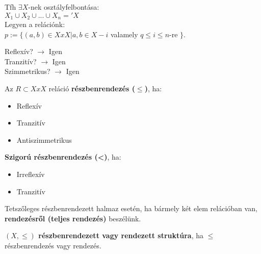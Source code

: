 \begin{frame}
\begin{tcolorbox}[title={Tétel: Ekvivalenciareláció és osztályfelbontás kapcsolata}]
Tfh ${\exists}X$-nek osztályfelbontása:\\

$X_1 \cup X_2 \cup ... \cup X_n =  'X$\\

Legyen a relációnk:\\

$p := \{(a,b) \in X x X | a, b \in X-i$ valamely $q \leq i \leq n$-re $\}$.\\
\mmedskip

Reflexív? $\rightarrow$ Igen\\
Tranzitív? $\rightarrow$ Igen\\
Szimmetrikus? $\rightarrow$ Igen
\end{tcolorbox}
\end{frame}


\begin{frame}
\begin{tcolorbox}[title={Def.: Részbenrendezés, Szigorú részbenrendezés}]
Az $R \subset X x X$ reláció \textbf{részbenrendezés (${\leq}$)}, ha:\\
\begin{itemize}
\item Reflexív
\item Tranzitív
\item Antiszimmetrikus
\end{itemize}
\mmedskip

\textbf{Szigorú részbenrendezés (<)}, ha:\\
\begin{itemize}
\item Irreflexív
\item Tranzitív
\end{itemize}
\end{tcolorbox}

\begin{tcolorbox}[title={Def.: Teljes rendezés}]
Tetszőleges részbenrendezett halmaz esetén, ha bármely két elem relációban van, \textbf{rendezésről (teljes rendezés)} beszélünk.
\end{tcolorbox}

\begin{tcolorbox}[title={Def.: Részbenrendezett, vagy rendezett struktúra}]
\textbf{$(X, {\leq})$ részbenrendezett vagy rendezett struktúra}, ha ${\leq}$ részbenrendezés vagy rendezés.
\end{tcolorbox}

\begin{tcolorbox}[title={Def.: Diagonális reláció}]
\end{tcolorbox}


\end{frame}

